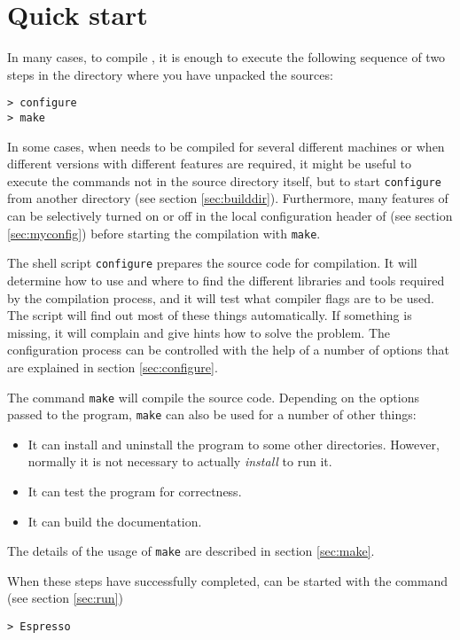\section{Quick start}

In many cases, to compile \es{}, it is enough to execute the following
sequence of two steps in the directory where you have unpacked the
sources:

\begin{verbatim}
> configure
> make
\end{verbatim}

In some cases, \eg{} when \es{} needs to be compiled for several
different machines or when different versions with different features
are required, it might be useful to execute the commands not in the
source directory itself, but to start \texttt{configure} from another
directory (see section \vref{sec:builddir}). Furthermore, many
features of \es{} can be selectively turned on or off in the local
configuration header of \es{} (see section \vref{sec:myconfig}) before
starting the compilation with \texttt{make}.

The shell script \texttt{configure} prepares the source code for
compilation. It will determine how to use and where to find the
different libraries and tools required by the compilation process, and
it will test what compiler flags are to be used.  The script will find
out most of these things automatically.  If something is missing, it
will complain and give hints how to solve the problem.  The
configuration process can be controlled with the help of a number of
options that are explained in section \vref{sec:configure}.

The command \texttt{make} will compile the source code. Depending on
the options passed to the program, \texttt{make} can also be used for
a number of other things:
\begin{itemize}
\item It can install and uninstall the program to some other
  directories. However, normally it is not necessary to actually
  \textit{install} \es{} to run it.
\item It can test the \es{} program for correctness.
\item It can build the documentation.
\end{itemize}
The details of the usage of \texttt{make} are described in section
\vref{sec:make}.

When these steps have successfully completed, \es{} can be started
with the command (see section \vref{sec:run})
\begin{verbatim}
> Espresso
\end{verbatim}

